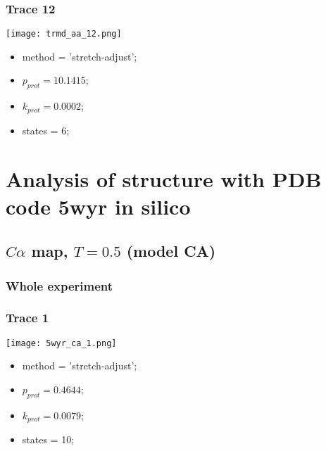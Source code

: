 \subsubsection{Trace 12}
\begin{minipage}[c]{0.7\textwidth}
    \texttt{[image: trmd\_aa\_12.png]}
\end{minipage}
\hfill
\begin{minipage}[c]{0.45\textwidth}
    \begin{itemize}
        \item method = 'stretch-adjust';
        \item $p_{prot}=10.1415$;
        \item $k_{prot}=0.0002$;
        \item states = 6;
    \end{itemize}
\end{minipage}

\section{Analysis of structure with PDB code 5wyr in silico}
\label{app:fit-details-5wyr-theory}
\subsection{$C\alpha$ map, $T=0.5$ (model CA)}
\subsubsection{Whole experiment}

\subsubsection{Trace 1}
\begin{minipage}[c]{0.7\textwidth}
    \texttt{[image: 5wyr\_ca\_1.png]}
\end{minipage}
\hfill
\begin{minipage}[c]{0.45\textwidth}
    \begin{itemize}
        \item method = 'stretch-adjust';
        \item $p_{prot}=0.4644$;
        \item $k_{prot}=0.0079$;
        \item states = 10;
    \end{itemize}
\end{minipage}

